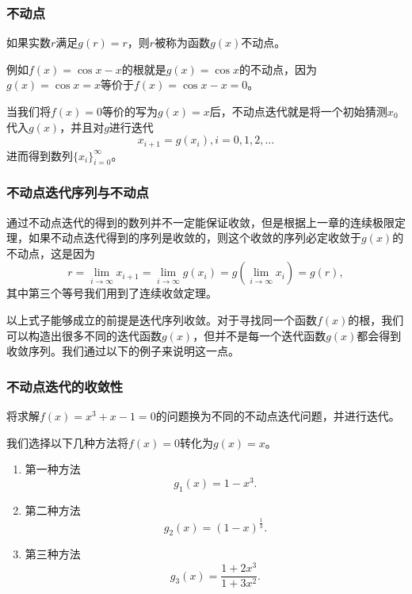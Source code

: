 \documentclass[10pt]{beamer}
\begin{document}
\begin{frame}
\frametitle{不动点}
\begin{definition}[不动点]
如果实数$r$满足$g(r) = r$，则$r$被称为函数$g(x)$不动点。
\end{definition}
例如$f(x) = \cos x - x$的根就是$g(x) = \cos x$的不动点，因为$g(x) = \cos x = x$等价于$f(x) = \cos x - x =0$。
\begin{definition}[不动点迭代]
当我们将$f(x) = 0$等价的写为$g(x) = x$后，不动点迭代就是将一个初始猜测$x_0$代入$g(x)$，并且对$g$进行迭代
\begin{equation}
x_{i+1} = g(x_i), i = 0,1,2,\ldots
\end{equation}
进而得到数列$\{x_i\}_{i = 0}^\infty$。
\end{definition}

\end{frame}

\begin{frame}
\frametitle{不动点迭代序列与不动点}
通过不动点迭代的得到的数列并不一定能保证收敛，但是根据上一章的连续极限定理，如果不动点迭代得到的序列是收敛的，则这个收敛的序列必定收敛于$g(x)$的不动点，这是因为
\begin{equation}
r = \lim_{i \rightarrow \infty} x_{i+1} = \lim_{i \rightarrow \infty} g(x_i) = g(  \lim_{i \rightarrow \infty} x_i) = g(r),
\end{equation}
其中第三个等号我们用到了连续收敛定理。
\vspace{0.5cm}

以上式子能够成立的前提是迭代序列收敛。对于寻找同一个函数$f(x)$的根，我们可以构造出很多不同的迭代函数$g(x)$，但并不是每一个迭代函数$g(x)$都会得到收敛序列。我们通过以下的例子来说明这一点。

\end{frame}

\begin{frame}
\frametitle{不动点迭代的收敛性}
\begin{example}
将求解$f(x) = x^3 + x -1 = 0$的问题换为不同的不动点迭代问题，并进行迭代。
\end{example}
我们选择以下几种方法将$f(x) = 0$转化为$g(x) = x$。

\begin{enumerate}
\item 第一种方法
\begin{equation}
\label{eq: FPI_Ex_1_g1}
g_1(x) = 1- x^3.
\end{equation}
\item 第二种方法
\begin{equation}
\label{eq: FPI_Ex_1_g2}
g_2(x) = (1-x)^{\frac{1}{3}}.
\end{equation}
\item 第三种方法
\begin{equation}
\label{eq: FPI_Ex_1_g3}
g_3(x) = \frac{1+2x^3}{1+3x^2}.
\end{equation}
\end{enumerate}

\end{frame}
\end{document}
